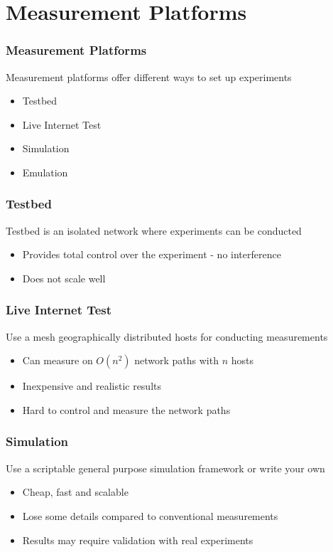 \documentclass{beamer}
\begin{document}
\section{Measurement Platforms}

\begin{frame}
\frametitle{Measurement Platforms}

Measurement platforms offer different ways to set up experiments

\begin{itemize}
	\item Testbed
	\item Live Internet Test
	\item Simulation
	\item Emulation
\end{itemize}
\end{frame}

\begin{frame}
\frametitle{Testbed}
Testbed is an isolated network where experiments can be conducted
\begin{itemize}
	\item Provides total control over the experiment - no interference
	\item Does not scale well
\end{itemize}

\end{frame}

\begin{frame}
\frametitle{Live Internet Test}
Use a mesh geographically distributed hosts for conducting measurements
\begin{itemize}
	\item Can measure on $O(n^2)$ network paths with $n$ hosts
	\item Inexpensive and realistic results
	\item Hard to control and measure the network paths 
\end{itemize}

\end{frame}

\begin{frame}
\frametitle{Simulation}
Use a scriptable general purpose simulation framework or write your own

\begin{itemize}
	\item Cheap, fast and scalable
	\item Lose some details compared to conventional measurements
	\item Results may require validation with real experiments
\end{itemize}

\end{frame}
\end{document}
